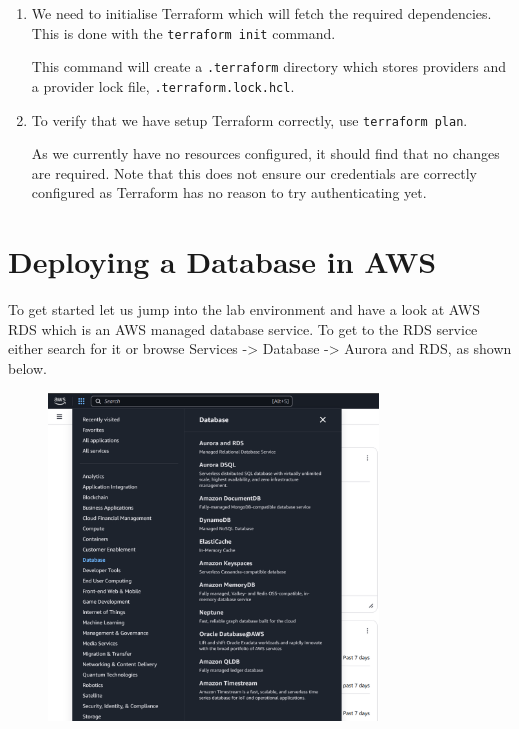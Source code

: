 \documentclass{csse4400}
\begin{document}
\begin{enumerate}
\item We need to initialise Terraform which will fetch the required dependencies.
    This is done with the \texttt{terraform init} command.

This command will create a \texttt{.terraform} directory which stores providers and a provider lock file, \texttt{.terraform.lock.hcl}.

\item To verify that we have setup Terraform correctly, use \texttt{terraform plan}.

As we currently have no resources configured, it should find that no changes are required.
Note that this does not ensure our credentials are correctly configured as Terraform has no reason to try authenticating yet.

\end{enumerate}


\section{Deploying a Database in AWS}



\noindent
To get started let us jump into the lab environment and have a look at AWS RDS which is an AWS managed database service. To get to the RDS service either search for it or browse Services -> Database -> Aurora and RDS, as shown below.

\begin{figure}[H]
\centering
\includegraphics[trim=0 180 0 0,clip,width=0.78\textwidth]{images/aws_1}
\end{figure}
\end{document}
